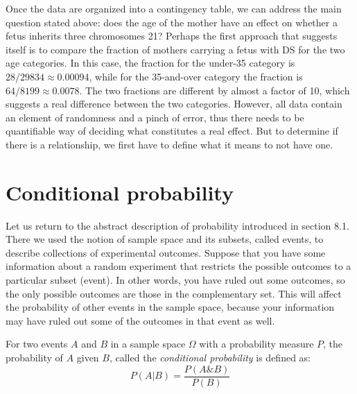 \documentclass[
  letterpaper,
  DIV=11,
  numbers=noendperiod]{scrreprt}
\begin{document}
Once the data are organized into a contingency table, we can address the
main question stated above: does the age of the mother have an effect on
whether a fetus inherits three chromosomes 21? Perhaps the first
approach that suggests itself is to compare the fraction of mothers
carrying a fetus with DS for the two age categories. In this case, the
fraction for the under-35 category is \(28/29834 \approx 0.00094\),
while for the 35-and-over category the fraction is
\(64/8199 \approx 0.0078\). The two fractions are different by almost a
factor of 10, which suggests a real difference between the two
categories. However, all data contain an element of randomness and a
pinch of error, thus there needs to be quantifiable way of deciding what
constitutes a real effect. But to determine if there is a relationship,
we first have to define what it means to not have one.

\hypertarget{conditional-probability}{%
\section{Conditional probability}\label{conditional-probability}}

\label{sec:math6_1}

Let us return to the abstract description of probability introduced in
section 8.1. There we used the notion of sample space and its subsets,
called events, to describe collections of experimental outcomes. Suppose
that you have some information about a random experiment that restricts
the possible outcomes to a particular subset (event). In other words,
you have ruled out some outcomes, so the only possible outcomes are
those in the complementary set. This will affect the probability of
other events in the sample space, because your information may have
ruled out some of the outcomes in that event as well.

\begin{tcolorbox}[enhanced jigsaw, coltitle=black, arc=.35mm, opacitybacktitle=0.6, breakable, bottomtitle=1mm, toptitle=1mm, titlerule=0mm, colback=white, leftrule=.75mm, rightrule=.15mm, colframe=quarto-callout-note-color-frame, colbacktitle=quarto-callout-note-color!10!white, opacityback=0, title=\textcolor{quarto-callout-note-color}{\faInfo}\hspace{0.5em}{Definition}, left=2mm, toprule=.15mm, bottomrule=.15mm]

For two events \(A\) and \(B\) in a sample space \(\Omega\) with a
probability measure \(P\), the probability of \(A\) given \(B\), called
the \emph{conditional probability} is defined as:
\[P(A|B) = \frac{P(A\& B)}{P(B)}\]

\end{tcolorbox}
\end{document}
